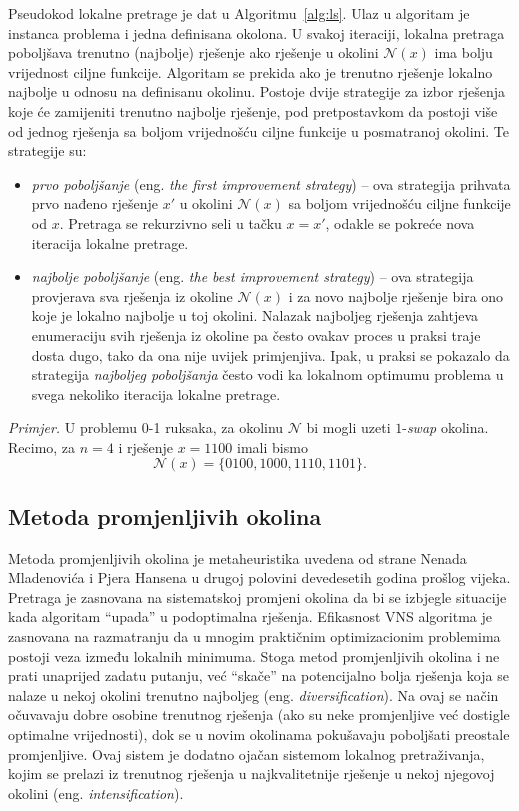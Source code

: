 \documentclass[a4paper, utf8, 11pt, colorlinks]{book}
\begin{document}
Pseudokod lokalne pretrage je dat u Algoritmu~\ref{alg:ls}. Ulaz u algoritam je instanca problema i jedna definisana okolona. U svakoj iteraciji, lokalna pretraga poboljšava trenutno (najbolje) rješenje ako    rješenje u okolini  $\mathcal{N}(x)$ ima bolju vrijednost ciljne funkcije. Algoritam se prekida ako je trenutno rješenje lokalno najbolje u odnosu na definisanu okolinu.
 Postoje dvije strategije za izbor rješenja koje će zamijeniti trenutno najbolje rješenje, pod pretpostavkom da postoji više od jednog rješenja sa boljom vrijednošću ciljne funkcije u posmatranoj okolini. Te strategije su:
 \begin{itemize}
 	\item \emph{prvo poboljšanje} (eng. \emph{the first improvement strategy}) -- ova strategija prihvata prvo nađeno rješenje $x'$ u okolini $\mathcal{N}(x)$ sa boljom vrijednošću ciljne funkcije od $x$. Pretraga se rekurzivno seli u tačku  $x = x'$, odakle se pokreće nova iteracija lokalne pretrage.
 	\item \emph{najbolje poboljšanje} (eng. \emph{the best improvement strategy}) --   ova strategija provjerava sva rješenja iz okoline $\mathcal{N}(x)$ i za novo najbolje rješenje bira ono koje je lokalno najbolje u toj okolini. Nalazak  najboljeg rješenja zahtjeva enumeraciju svih rješenja iz okoline pa često ovakav proces u praksi traje dosta dugo,  tako da ona nije uvijek primjenjiva. Ipak, u praksi se pokazalo da strategija \emph{najboljeg poboljšanja} često vodi ka lokalnom optimumu problema u svega nekoliko iteracija lokalne pretrage. 
 \end{itemize}
  
  \emph{Primjer.} U   problemu 0-1 ruksaka, za okolinu $\mathcal{N}$ bi mogli uzeti $1$-\emph{swap} okolina. Recimo, za $n=4$ i rješenje $x=1100$ imali  bismo $$\mathcal{N}(x)= \{ 0100, 1000, 1110, 1101 \}.$$ 
  
\subsection{Metoda promjenljivih okolina}\label{intro:vns}
Metoda promjenljivih okolina je metaheuristika uvedena od strane Nenada Mladenovića i Pjera Hansena u drugoj polovini devedesetih godina prošlog vijeka.
Pretraga je zasnovana na sistematskoj promjeni okolina da bi se izbjegle situacije kada algoritam ``upada'' u podoptimalna rješenja. Efikasnost VNS algoritma je zasnovana na razmatranju da u mnogim praktičnim optimizacionim problemima postoji veza između lokalnih minimuma. Stoga metod promjenljivih okolina i ne prati unaprijed zadatu putanju, već ``skače'' na potencijalno bolja rješenja koja se nalaze u nekoj okolini trenutno najboljeg (eng. \emph{diversification}).
Na ovaj se način očuvavaju dobre osobine trenutnog rješenja (ako su neke promjenljive već dostigle optimalne vrijednosti), dok se u novim okolinama pokušavaju poboljšati preostale promjenljive. Ovaj sistem je dodatno ojačan sistemom lokalnog pretraživanja, kojim se prelazi iz trenutnog rješenja u najkvalitetnije rješenje u nekoj njegovoj okolini (eng. \emph{intensification}).
\end{document}
